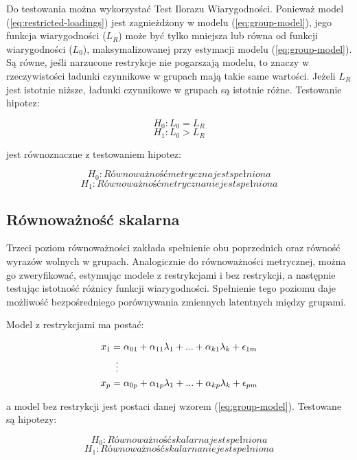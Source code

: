 \documentclass[12pt]{article}
\begin{document}
Do testowania można wykorzystać Test Ilorazu Wiarygodności. Ponieważ model (\ref{eq:restricted-loadings}) jest zagnieżdżony w modelu (\ref{eq:group-model}), jego funkcja wiarygodności (\(L_R\)) może być tylko mniejsza lub równa od funkcji wiarygodności (\(L_0\)), maksymalizowanej przy estymacji modelu (\ref{eq:group-model}). Są równe, jeśli narzucone restrykcje nie pogarszają modelu, to znaczy w rzeczywistości ładunki czynnikowe w grupach mają takie same wartości. Jeżeli \(L_R\) jest istotnie niższe, ładunki czynnikowe w grupach są istotnie różne. Testowanie hipotez:

\[H_0: L_0 = L_R\]
\[H_1: L_0 > L_R\]

jest równoznaczne z testowaniem hipotez:

\[H_0: Równoważność metryczna jest spełniona\]
\[H_1: Równoważność metryczna nie jest spełniona\]

\hypertarget{ruxf3wnowaux17cnoux15bux107-skalarna}{%
\subsection{Równoważność skalarna}\label{ruxf3wnowaux17cnoux15bux107-skalarna}}

Trzeci poziom równoważności zakłada spełnienie obu poprzednich oraz równość wyrazów wolnych w grupach. Analogicznie do równoważności metrycznej, można go zweryfikować, estymując modele z restrykcjami i bez restrykcji, a następnie testując istotność różnicy funkcji wiarygodności. Spełnienie tego poziomu daje możliwość bezpośredniego porównywania zmiennych latentnych między grupami.

Model z restrykcjami ma postać:

\begin{align} 
\label{eq:restricted-intercepts}
\begin{split}
x_1 &= \alpha_{01} + \alpha_{11} \lambda_1 + ... + \alpha_{k1} \lambda_k + \epsilon_{1m}\\
& \vdotswithin{=} \\
x_p &= \alpha_{0p} + \alpha_{1p} \lambda_1 + ... + \alpha_{kp} \lambda_k + \epsilon_{pm}\\
\end{split}
\end{align}

a model bez restrykcji jest postaci danej wzorem (\ref{eq:group-model}). Testowane są hipotezy:

\[H_0: Równoważność skalarna jest spełniona\]
\[H_1: Równoważność skalarna nie jest spełniona\]
\end{document}
